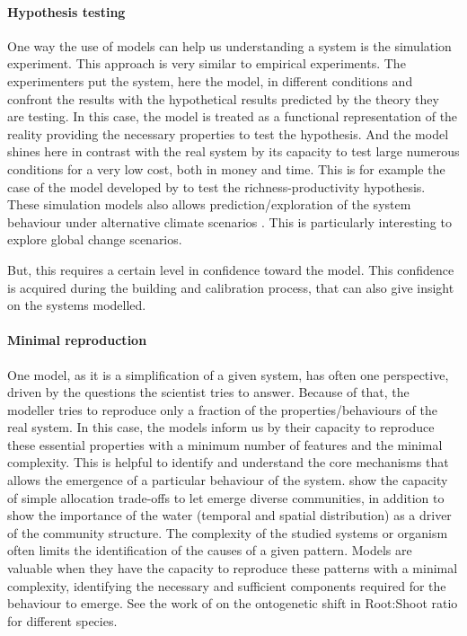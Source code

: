 \paragraph{Hypothesis testing}

One way the use of models can help us understanding a system is the simulation experiment. This approach is very similar to empirical experiments. The experimenters put the system, here the model, in different conditions and confront the results with the hypothetical results predicted by the theory they are testing. In this case, the model is treated as a functional representation of the reality providing the necessary properties to test the hypothesis. And the model shines here in contrast with the real system by its capacity to test large numerous conditions for a very low cost, both in money and time. This is for example the case of the model developed by \cite{taubert_modelling_2014} to test the richness-productivity hypothesis. These simulation models also allows prediction/exploration of the system behaviour under alternative climate scenarios \parencite{rodriguez_lingra-cc:_1999, scheiter_impacts_2009}. This is particularly interesting to explore global change scenarios.

But, this requires a certain level in confidence toward the model. This confidence is acquired during the building and calibration process, that can also give insight on the systems modelled.

\paragraph{Minimal reproduction}

One model, as it is a simplification of a given system, has often one perspective, driven by the questions the scientist tries to answer. Because of that, the modeller tries to reproduce only a fraction of the properties/behaviours of the real system. In this case, the models inform us by their capacity to reproduce these essential properties with a minimum number of features and the minimal complexity. This is helpful to identify and understand the core mechanisms that allows the emergence of a particular behaviour of the system. \cite{reineking_environmental_2006} show the capacity of simple allocation trade-offs to let emerge diverse communities, in addition to show the importance of the water (temporal and spatial distribution) as a driver of the community structure. The complexity of the studied systems or organism often limits the identification of the causes of a given pattern. Models are valuable when they have the capacity to reproduce these patterns with a minimal complexity, identifying the necessary and sufficient components required for the behaviour to emerge. See the work of \cite{lohier_explaining_2014} on the ontogenetic shift in Root:Shoot ratio for different species.

